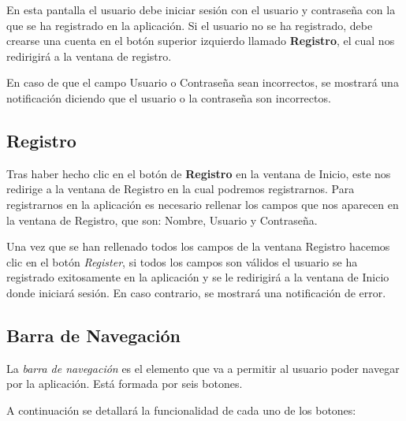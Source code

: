 
En esta pantalla el usuario debe iniciar sesión con el usuario y contraseña con la que se ha registrado en la aplicación. Si el usuario no se ha registrado, debe crearse una cuenta en el botón superior izquierdo llamado \textbf{Registro}, el cual nos redirigirá a la ventana de registro.

En caso de que el campo Usuario o Contraseña sean incorrectos, se mostrará una notificación diciendo que el usuario o la contraseña son incorrectos.
\newpage
\subsection{Registro}


Tras haber hecho clic en el botón  de \textbf{Registro} en la ventana de Inicio, este nos redirige a la ventana de Registro en la cual podremos registrarnos. Para registrarnos en la aplicación es necesario rellenar los campos que nos aparecen en la ventana de Registro, que son: Nombre, Usuario y Contraseña.

Una vez que se han rellenado todos los campos de la ventana Registro hacemos clic en el botón \textit{Register}, si todos los campos son válidos el usuario se ha registrado exitosamente en la aplicación y se le redirigirá a la ventana de Inicio donde iniciará sesión. En caso contrario, se mostrará una notificación de error.

\subsection{Barra de Navegación}


La \textit{barra de navegación} es el elemento que va a permitir al usuario poder navegar por la aplicación. Está formada por seis botones.

A continuación se detallará la funcionalidad de cada uno de los botones:

